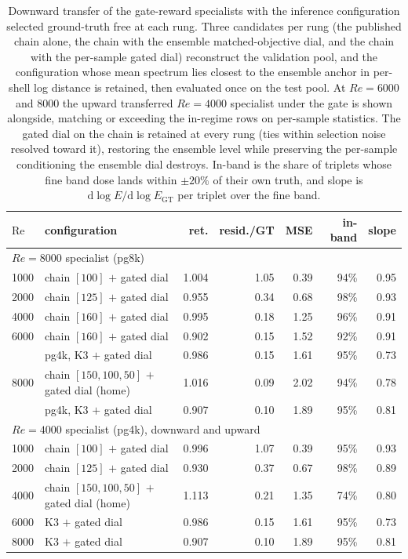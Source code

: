 \begin{table}[H]
  \centering
  \caption{Downward transfer of the gate-reward specialists with the inference configuration selected ground-truth free at each rung. Three candidates per rung (the published chain alone, the chain with the ensemble matched-objective dial, and the chain with the per-sample gated dial) reconstruct the validation pool, and the configuration whose mean spectrum lies closest to the ensemble anchor in per-shell log distance is retained, then evaluated once on the test pool. At $Re{=}6000$ and $8000$ the upward transferred $Re{=}4000$ specialist under the gate is shown alongside, matching or exceeding the in-regime rows on per-sample statistics. The gated dial on the chain is retained at every rung (ties within selection noise resolved toward it), restoring the ensemble level while preserving the per-sample conditioning the ensemble dial destroys. In-band is the share of triplets whose fine band dose lands within $\pm20\%$ of their own truth, and slope is $\mathrm{d}\log E/\mathrm{d}\log E_{\mathrm{GT}}$ per triplet over the fine band.}
  \label{tab:pg-down-bestconfig}
  \begin{tabular}{llrrrrr}
    \toprule
    $\mathrm{Re}$ & configuration & ret. & resid./GT & MSE & in-band & slope \\
    \midrule
    \multicolumn{7}{l}{$Re{=}8000$ specialist (pg8k)} \\
    \midrule
    1000 & chain $[100]$ $+$ gated dial & 1.004 & 1.05 & 0.39 & 94\% & 0.95 \\
    2000 & chain $[125]$ $+$ gated dial & 0.955 & 0.34 & 0.68 & 98\% & 0.93 \\
    4000 & chain $[160]$ $+$ gated dial & 0.995 & 0.18 & 1.25 & 96\% & 0.91 \\
    6000 & chain $[160]$ $+$ gated dial & 0.902 & 0.15 & 1.52 & 92\% & 0.91 \\
         & pg4k, K3 $+$ gated dial & 0.986 & 0.15 & 1.61 & 95\% & 0.73 \\
    8000 & chain $[150,100,50]$ $+$ gated dial (home) & 1.016 & 0.09 & 2.02 & 94\% & 0.78 \\
         & pg4k, K3 $+$ gated dial & 0.907 & 0.10 & 1.89 & 95\% & 0.81 \\
    \midrule
    \multicolumn{7}{l}{$Re{=}4000$ specialist (pg4k), downward and upward} \\
    \midrule
    1000 & chain $[100]$ $+$ gated dial & 0.996 & 1.07 & 0.39 & 95\% & 0.93 \\
    2000 & chain $[125]$ $+$ gated dial & 0.930 & 0.37 & 0.67 & 98\% & 0.89 \\
    4000 & chain $[150,100,50]$ $+$ gated dial (home) & 1.113 & 0.21 & 1.35 & 74\% & 0.80 \\
    6000 & K3 $+$ gated dial & 0.986 & 0.15 & 1.61 & 95\% & 0.73 \\
    8000 & K3 $+$ gated dial & 0.907 & 0.10 & 1.89 & 95\% & 0.81 \\
    \bottomrule
  \end{tabular}
\end{table}
